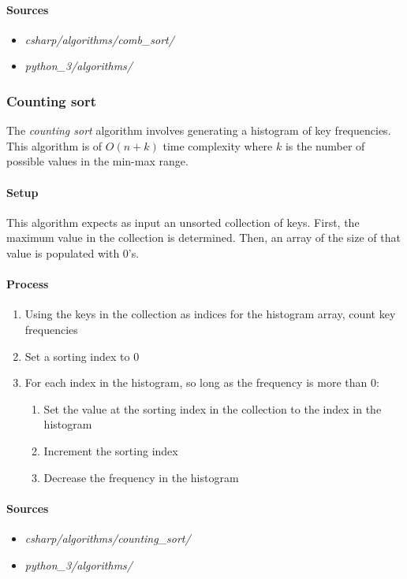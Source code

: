 \documentclass{article}
\begin{document}
\begin{samepage}
  \paragraph{Sources}
  \begin{itemize}
  \item{{\em csharp/algorithms/comb\_sort/}}
  \item{{\em python\_3/algorithms/}}
  \end{itemize}
\end{samepage}


\subsubsection{Counting sort}
The {\em counting sort} algorithm involves generating a histogram of key frequencies. This algorithm is of
\(O(n+k)\) time complexity where \(k\) is the number of possible values in the min-max range.

\paragraph{Setup}
This algorithm expects as input an unsorted collection of keys. First, the maximum value in the collection is
determined. Then, an array of the size of that value is populated with 0's.

\paragraph{Process}
\begin{enumerate}
\item{Using the keys in the collection as indices for the histogram array, count key frequencies}
\item{Set a sorting index to 0}
\item{For each index in the histogram, so long as the frequency is more than 0:}
  \begin{enumerate}
  \item{Set the value at the sorting index in the collection to the index in the histogram}
  \item{Increment the sorting index}
  \item{Decrease the frequency in the histogram}
  \end{enumerate}
\end{enumerate}

\begin{samepage}
  \paragraph{Sources}
  \begin{itemize}
  \item{{\em csharp/algorithms/counting\_sort/}}
  \item{{\em python\_3/algorithms/}}
  \end{itemize}
\end{samepage}
\end{document}
